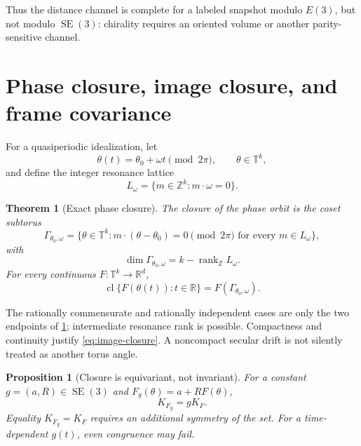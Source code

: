 \documentclass[11pt,a4paper]{article}
\theoremstyle{definition}
\theoremstyle{plain}
\newtheorem{theorem}[definition]{Theorem}
\newtheorem{proposition}[definition]{Proposition}
\theoremstyle{remark}
\newcommand{\R}{\mathbb{R}}
\newcommand{\Z}{\mathbb{Z}}
\newcommand{\Torus}{\mathbb{T}}
\newcommand{\SE}{\operatorname{SE}}
\newcommand{\rank}{\operatorname{rank}}
\newcommand{\cl}{\operatorname{cl}}
\begin{document}
Thus the distance channel is complete for a labeled snapshot modulo
\(E(3)\), but not modulo \(\SE(3)\): chirality requires an oriented
volume or another parity-sensitive channel.

\section{Phase closure, image closure, and frame covariance}

For a quasiperiodic idealization, let
\begin{equation}\label{eq:phase-flow}
\theta(t)=\theta_0+\omega t\pmod{2\pi},
\qquad \theta\in\Torus^k ,
\end{equation}
and define the integer resonance lattice
\begin{equation}\label{eq:lattice}
L_\omega=\{m\in\Z^k:m\cdot\omega=0\}.
\end{equation}

\begin{theorem}[Exact phase closure]
\label{thm:torus}
The closure of the phase orbit is the coset subtorus
\begin{equation}\label{eq:phase-closure}
\Gamma_{\theta_0,\omega}
=\{\theta\in\Torus^k:
m\cdot(\theta-\theta_0)=0\pmod{2\pi}
\text{ for every }m\in L_\omega\},
\end{equation}
with
\[
\dim\Gamma_{\theta_0,\omega}
=k-\rank_{\Z}L_\omega .
\]
For every continuous \(F:\Torus^k\to\R^d\),
\begin{equation}\label{eq:image-closure}
\cl\{F(\theta(t)):t\in\R\}
=F(\Gamma_{\theta_0,\omega}).
\end{equation}
\end{theorem}

The rationally commensurate and rationally independent cases are only
the two endpoints of \cref{thm:torus}; intermediate resonance rank is
possible.  Compactness and continuity justify
\cref{eq:image-closure}.  A noncompact secular drift is not silently
treated as another torus angle.

\begin{proposition}[Closure is equivariant, not invariant]
\label{prop:closure}
For a constant \(g=(a,R)\in\SE(3)\) and
\(F_g(\theta)=a+RF(\theta)\),
\begin{equation}\label{eq:closure-equivariance}
K_{F_g}=gK_F .
\end{equation}
Equality \(K_{F_g}=K_F\) requires an additional symmetry of the set.
For a time-dependent \(g(t)\), even congruence may fail.
\end{proposition}
\end{document}
